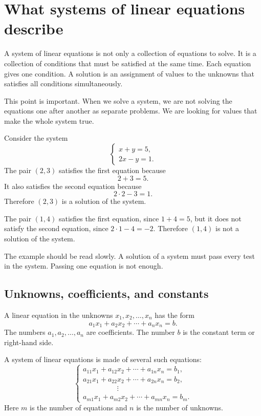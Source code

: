 \section{What systems of linear equations describe}

A system of linear equations is not only a collection of equations to solve. It is a collection of conditions that must be satisfied at the same time. Each equation gives one condition. A solution is an assignment of values to the unknowns that satisfies all conditions simultaneously.

This point is important. When we solve a system, we are not solving the equations one after another as separate problems. We are looking for values that make the whole system true.

\begin{examplebox}
Consider the system
\[
\begin{cases}
x+y=5,\\
2x-y=1.
\end{cases}
\]
The pair \((2,3)\) satisfies the first equation because
\[
2+3=5.
\]
It also satisfies the second equation because
\[
2\cdot2-3=1.
\]
Therefore \((2,3)\) is a solution of the system.

The pair \((1,4)\) satisfies the first equation, since \(1+4=5\), but it does not satisfy the second equation, since \(2\cdot1-4=-2\). Therefore \((1,4)\) is not a solution of the system.
\end{examplebox}

The example should be read slowly. A solution of a system must pass every test in the system. Passing one equation is not enough.

\subsection*{Unknowns, coefficients, and constants}

A linear equation in the unknowns \(x_1,x_2,\ldots,x_n\) has the form
\[
a_1x_1+a_2x_2+\cdots+a_nx_n=b.
\]
The numbers \(a_1,a_2,\ldots,a_n\) are coefficients. The number \(b\) is the constant term or right-hand side.

A system of linear equations is made of several such equations:
\[
\begin{cases}
a_{11}x_1+a_{12}x_2+\cdots+a_{1n}x_n=b_1,\\
a_{21}x_1+a_{22}x_2+\cdots+a_{2n}x_n=b_2,\\
\hspace{2cm}\vdots\\
a_{m1}x_1+a_{m2}x_2+\cdots+a_{mn}x_n=b_m.
\end{cases}
\]
Here \(m\) is the number of equations and \(n\) is the number of unknowns.

